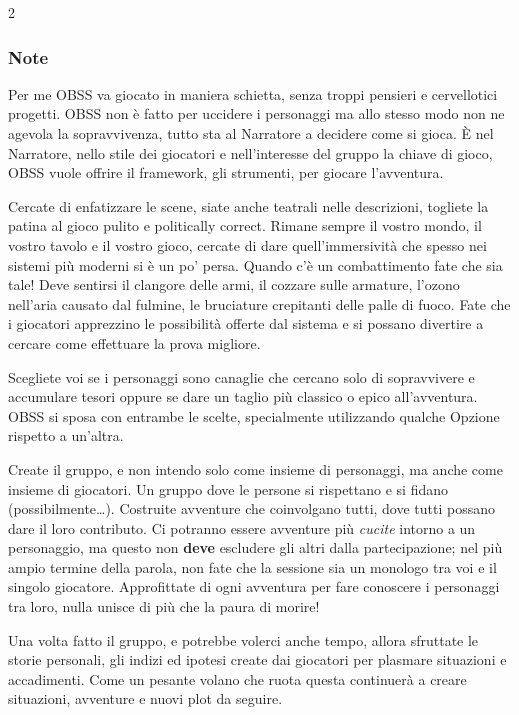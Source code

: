 \begin{multicols}{2}

\subsubsection*{Note}

{\small

Per me OBSS va giocato in maniera schietta, senza troppi pensieri e cervellotici progetti. OBSS non è fatto per uccidere i personaggi ma allo stesso modo non ne agevola la sopravvivenza, tutto sta al Narratore a decidere come si gioca. È nel Narratore, nello stile dei giocatori e nell'interesse del gruppo la chiave di gioco, OBSS vuole offrire il framework, gli strumenti, per giocare l'avventura.

Cercate di enfatizzare le scene, siate anche teatrali nelle descrizioni, togliete la patina al gioco pulito e politically correct. Rimane sempre il vostro mondo, il vostro tavolo e il vostro gioco, cercate di dare quell'immersività che spesso nei sistemi più moderni si è un po' persa.
Quando c'è un combattimento fate che sia tale! Deve sentirsi il clangore delle armi, il cozzare sulle armature, l'ozono nell'aria causato dal fulmine, le bruciature crepitanti delle palle di fuoco. Fate che i giocatori apprezzino le possibilità offerte dal sistema e si possano divertire a cercare come effettuare la prova migliore.

Scegliete voi se i personaggi sono canaglie che cercano solo di sopravvivere e accumulare tesori oppure se dare un taglio più classico o epico all'avventura. OBSS si sposa con entrambe le scelte, specialmente utilizzando qualche Opzione rispetto a un'altra.

Create il gruppo, e non intendo solo come insieme di personaggi, ma anche come insieme di giocatori. Un gruppo dove le persone si rispettano e si fidano (possibilmente…). Costruite avventure che coinvolgano tutti, dove tutti possano dare il loro contributo. Ci potranno essere avventure più \emph{cucite} intorno a un personaggio, ma questo non \textbf{deve} escludere gli altri dalla partecipazione; nel più ampio termine della parola, non fate che la sessione sia un monologo tra voi e il singolo giocatore.
Approfittate di ogni avventura per fare conoscere i personaggi tra loro, nulla unisce di più che la paura di morire!

Una volta fatto il gruppo, e potrebbe volerci anche tempo, allora sfruttate le storie personali, gli indizi ed ipotesi create dai giocatori per plasmare situazioni e accadimenti. Come un pesante volano che ruota questa continuerà a creare situazioni, avventure e nuovi plot da seguire.

}
\end{multicols}
